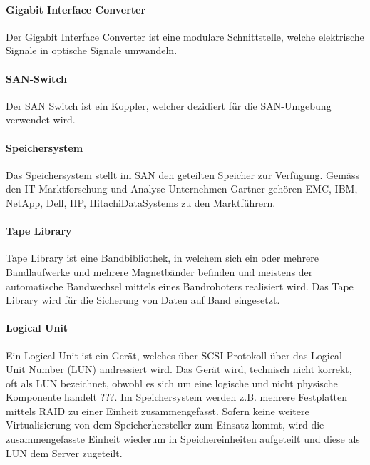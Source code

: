 \paragraph*{Gigabit Interface Converter}
Der Gigabit Interface Converter ist eine modulare Schnittstelle, welche elektrische Signale in optische Signale umwandeln. \cite{SNIA2011}

\paragraph*{SAN-Switch}
Der SAN Switch ist ein Koppler, welcher dezidiert für die SAN-Umgebung verwendet wird.

\paragraph*{Speichersystem}
Das Speichersystem stellt im SAN den geteilten Speicher zur Verfügung. Gemäss den IT Marktforschung und Analyse Unternehmen Gartner gehören \gls{EMC}, \gls{IBM}, NetApp, \gls{Dell}, \gls{HP}, \gls{HitachiDataSystems} zu den Marktführern. \cite{RogerW.CoxPushanRinnenStanleyZaffos2011}

\paragraph*{Tape Library}
Tape Library ist eine Bandbibliothek, in welchem sich ein oder mehrere Bandlaufwerke und mehrere Magnetbänder befinden und meistens der automatische Bandwechsel mittels eines Bandroboters realisiert wird. Das Tape Library wird für die Sicherung von Daten auf Band eingesetzt.

\paragraph*{Logical Unit}
Ein Logical Unit ist ein Gerät, welches über SCSI-Protokoll über das Logical Unit Number (LUN) andressiert wird. Das Gerät wird, technisch nicht korrekt, oft als LUN bezeichnet, obwohl es sich um eine logische und nicht physische Komponente handelt ???. Im Speichersystem werden z.B. mehrere Festplatten mittels RAID zu einer Einheit zusammengefasst. Sofern keine weitere Virtualisierung von dem Speicherhersteller zum Einsatz kommt, wird die zusammengefasste Einheit wiederum in Speichereinheiten aufgeteilt und diese als LUN dem Server zugeteilt. \cite{SNIA2011}

